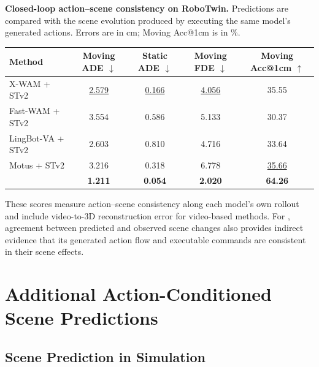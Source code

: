 \begin{center}
\begin{minipage}{\linewidth}
\makeatletter{}\makeatother
    \centering
    \small
    \setlength{\tabcolsep}{4pt}
    \renewcommand{\arraystretch}{1.10}
    \caption{\textbf{Closed-loop action--scene consistency on RoboTwin.}
    Predictions are compared with the scene evolution produced by executing
    the same model's generated actions. Errors are in cm; Moving Acc@1cm
    is in \%.}
    \label{tab:app:joint_consistency}
    \begin{adjustbox}{max width=\linewidth}
    \begin{tabular}{@{}lcccc@{}}
        \toprule
        Method & Moving ADE $\downarrow$ & Static ADE $\downarrow$
        & Moving FDE $\downarrow$ & Moving Acc@1cm $\uparrow$ \\
        \midrule
        X-WAM + STv2 & \underline{2.579} & \underline{0.166} & \underline{4.056} & 35.55 \\
        Fast-WAM + STv2 & 3.554 & 0.586 & 5.133 & 30.37 \\
        LingBot-VA + STv2 & 2.603 & 0.810 & 4.716 & 33.64 \\
        Motus + STv2 & 3.216 & 0.318 & 6.778 & \underline{35.66} \\
        \method{} & \textbf{1.211} & \textbf{0.054} & \textbf{2.020} & \textbf{64.26} \\
        \bottomrule
    \end{tabular}
    \end{adjustbox}
\end{minipage}
\end{center}

These scores measure action--scene consistency along each model's own
rollout and include video-to-3D reconstruction error for video-based methods.
For \method{}, agreement between predicted and observed scene changes also
provides indirect evidence that its generated action flow and executable
commands are consistent in their scene effects.


\section{Additional Action-Conditioned Scene Predictions}
\label{app:scene_flow_visualizations}

\subsection{Scene Prediction in Simulation}
\label{app:sim_scene_flow}

